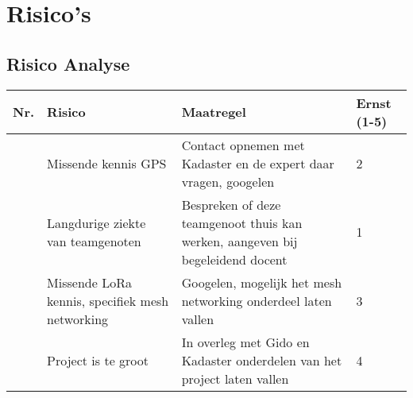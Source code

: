 \newcommand{\printrisk}{\arabic{risk}\stepcounter{risk}}
\section{Risico's}
\subsection{Risico Analyse}

\begin{tabularx}{\textwidth}{| p{1.1cm} | X | X | p{1.1cm} |}
    \hline
    \textbf{Nr.} & \textbf{Risico} & \textbf{Maatregel} & \textbf{Ernst (1-5)}
    \\ \hline

    \printrisk & Missende kennis GPS
               & Contact opnemen met Kadaster en de expert daar vragen, googelen
               & 2\\ \hline

    \printrisk & Langdurige ziekte van teamgenoten
               & Bespreken of deze teamgenoot thuis kan werken,
                 aangeven bij begeleidend docent
               & 1\\ \hline

    \printrisk & Missende LoRa kennis, specifiek mesh networking
               & Googelen, mogelijk het mesh networking onderdeel laten vallen
               & 3\\ \hline

    \printrisk & Project is te groot
               & In overleg met Gido en Kadaster onderdelen van het project
                 laten vallen
               & 4\\ \hline
\end{tabularx}
